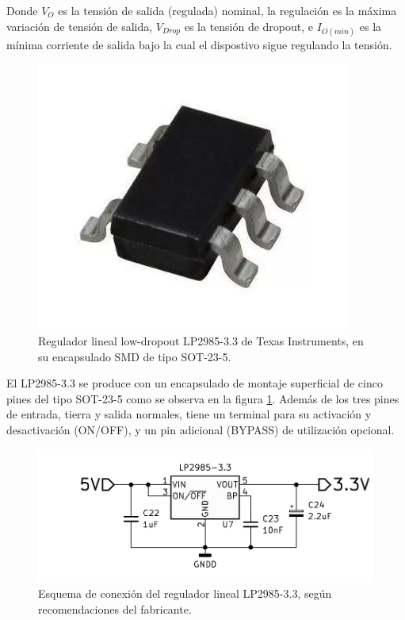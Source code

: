 Donde $V_O$ es la tensión de salida (regulada) nominal, la regulación es la máxima variación de tensión de salida, $V_{Drop}$ es la tensión de dropout, e $I_{O(min)}$ es la mínima corriente de salida bajo la cual el dispostivo sigue regulando la tensión.\\

\begin{figure}[h]
    \centering
    \includegraphics[scale=0.2]{Imagenes/SOT-23-5.png}
    \caption{Regulador lineal low-dropout LP2985-3.3 de Texas Instruments, en su encapsulado SMD de tipo SOT-23-5.}
    \label{encapsulado_LP2985}
\end{figure}

El LP2985-3.3 se produce con un encapsulado de montaje superficial de cinco pines del tipo SOT-23-5 como se observa en la figura \ref{encapsulado_LP2985}. Además de los tres pines de entrada, tierra y salida normales, tiene un terminal para su activación y desactivación (ON/OFF), y un pin adicional (BYPASS) de utilización opcional.\\

\begin{figure}[h]
    \centering
    \includegraphics[scale=1.3]{Imagenes/Conexion LP2985.png}
    \caption{Esquema de conexión del regulador lineal LP2985-3.3, según recomendaciones del fabricante.}
    \label{conexion_LP2985}
\end{figure}

